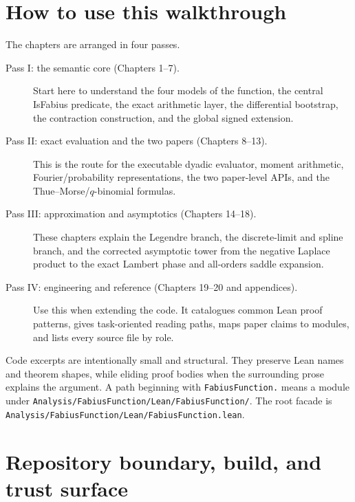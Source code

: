 \documentclass[11pt,a4paper,openany]{book}
\def\decl#1{#1}
\newcommand{\decl}[1]{\texttt{\detokenize{#1}}}
\newcommand{\pathbreak}[1]{\nolinkurl{#1}}
\begin{document}
\chapter*{How to use this walkthrough}
The chapters are arranged in four passes.

\begin{description}
\item[Pass I: the semantic core (Chapters 1--7).]
Start here to understand the four models of the function, the central
\decl{IsFabius} predicate, the exact arithmetic layer, the differential
bootstrap, the contraction construction, and the global signed extension.

\item[Pass II: exact evaluation and the two papers (Chapters 8--13).]
This is the route for the executable dyadic evaluator, moment arithmetic,
Fourier/probability representations, the two paper-level APIs, and the
Thue--Morse/$q$-binomial formulas.

\item[Pass III: approximation and asymptotics (Chapters 14--18).]
These chapters explain the Legendre branch, the discrete-limit and spline
branch, and the corrected asymptotic tower from the negative Laplace product to
the exact Lambert phase and all-orders saddle expansion.

\item[Pass IV: engineering and reference (Chapters 19--20 and appendices).]
Use this when extending the code.  It catalogues common Lean proof patterns,
gives task-oriented reading paths, maps paper claims to modules, and lists every
source file by role.
\end{description}

Code excerpts are intentionally small and structural.  They preserve Lean
names and theorem shapes, while eliding proof bodies when the surrounding prose
explains the argument.  A path beginning with \pathbreak{FabiusFunction.}
means a module under
\pathbreak{Analysis/FabiusFunction/Lean/FabiusFunction/}.  The root facade is
\pathbreak{Analysis/FabiusFunction/Lean/FabiusFunction.lean}.

\tableofcontents
\mainmatter

\chapter{Repository boundary, build, and trust surface}
\label{ch:boundary}
\end{document}

